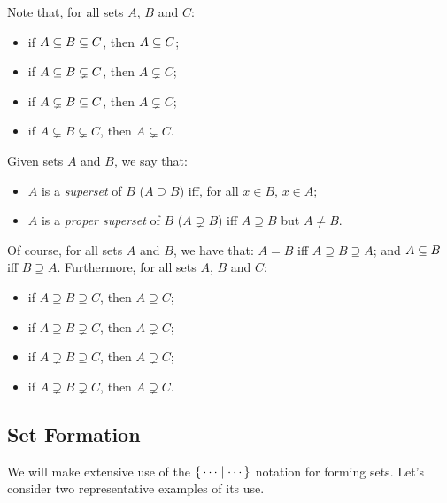 Note that, for all sets $A$, $B$ and $C$:
\begin{itemize}
\item if $A\subseteq B\subseteq C$, then $A\subseteq C$;

\item if $A\subseteq B\subsetneq C$, then $A\subsetneq C$;

\item if $A\subsetneq B\subseteq C$, then $A\subsetneq C$;

\item if $A\subsetneq B\subsetneq C$, then $A\subsetneq C$.
\end{itemize}

Given sets $A$ and $B$, we say that:
\begin{itemize}
\item $A$ is a \emph{superset}
%
%
of $B$ ($A\supseteq B$)
%
%
iff, for all $x\in B$, $x\in A$;

\item $A$ is a
\emph{proper superset}
%
%
%
of $B$ ($A\supsetneq B$)
%
%
iff $A\supseteq B$ but $A\neq B$.
\end{itemize}
Of course, for all sets $A$ and $B$, we have that:
$A=B$ iff $A\supseteq B\supseteq A$; and $A\subseteq B$ iff $B\supseteq A$.
Furthermore, for all sets $A$, $B$ and $C$:
\begin{itemize}
\item if $A\supseteq B\supseteq C$, then $A\supseteq C$;

\item if $A\supseteq B\supsetneq C$, then $A\supsetneq C$;

\item if $A\supsetneq B\supseteq C$, then $A\supsetneq C$;

\item if $A\supsetneq B\supsetneq C$, then $A\supsetneq C$.
\end{itemize}

\subsection{Set Formation}

We will make extensive use of the $\{ \, \cdots \mid \cdots \, \}$ notation
for forming sets.
%
%
%
%
Let's consider two representative examples of its use.

